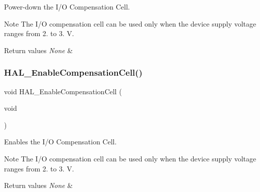 Power-\/down the I/O Compensation Cell. 

\begin{DoxyNote}{Note}
The I/O compensation cell can be used only when the device supply voltage ranges from 2. to 3. V. ~\newline

\end{DoxyNote}

\begin{DoxyRetVals}{Return values}
{\em None} & \\
\hline
\end{DoxyRetVals}
\mbox{\label{group___h_a_l___exported___functions___group2_ga20b6ca07582e10aec5e15ad2fda7dfc1}} 
\subsubsection{\texorpdfstring{H\+A\+L\+\_\+\+Enable\+Compensation\+Cell()}{HAL\_EnableCompensationCell()}}
{\footnotesize\ttfamily void H\+A\+L\+\_\+\+Enable\+Compensation\+Cell (\begin{DoxyParamCaption}\item[{void}]{ }\end{DoxyParamCaption})}



Enables the I/O Compensation Cell. 

\begin{DoxyNote}{Note}
The I/O compensation cell can be used only when the device supply voltage ranges from 2. to 3. V. ~\newline

\end{DoxyNote}

\begin{DoxyRetVals}{Return values}
{\em None} & \\
\hline
\end{DoxyRetVals}
\mbox{\label{group___h_a_l___exported___functions___group2_gaff785f069ed650de77ff82ac407f7c84}} 
